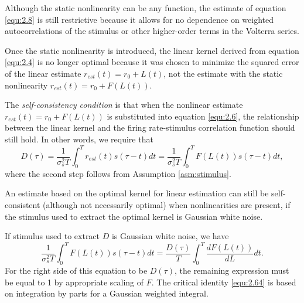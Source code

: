 \begin{rem}
  Although the static nonlinearity can be any function, the estimate of equation \ref{equ:2.8} is still restrictive because it allows for no dependence on weighted autocorrelations of the stimulus or other higher-order terms in the Volterra series.
\end{rem}

\begin{rem}
  Once the static nonlinearity is introduced, the linear kernel derived from equation \ref{equ:2.4} is no longer optimal because it was chosen to minimize the squared error of the linear estimate $r_{est}(t) = r_0 + L(t)$, not the estimate with the static nonlinearity $r_{est}(t) = r_0 + F(L(t))$.
\end{rem}

\begin{defn}
  \label{selfConsistency}
  The \emph{self-consistency condition} is that when the nonlinear estimate $r_{est}(t) = r_0 + F(L(t))$ is substituted into equation \ref{equ:2.6}, the relationship between the linear kernel and the firing rate-stimulus correlation function should still hold. In other words, we require that
  \begin{equation}
    \label{equ:2.63}
    D(\tau)  = \frac{1}{\sigma_s^2T}\int_0^Tr_{est}(t)s(\tau-t)dt = \frac{1}{\sigma_s^2T}\int_0^TF(L(t))s(\tau-t)dt,
  \end{equation}
  where the second step follows from Assumption \ref{asm:stimulus}.
\end{defn}

\begin{thm}
  \label{thm:Bussgang}
  An estimate based on the optimal kernel for linear estimation can still be self-consistent (although not necessarily optimal) when nonlinearities are present, if the stimulus used to extract the optimal kernel is Gaussian white noise.
\end{thm}
\begin{solution}
  If stimulus used to extract $D$ is Gaussian white noise, we have
  \begin{equation}
    \label{equ:2.64}
    \frac{1}{\sigma_s^2T}\int_0^TF(L(t))s(\tau-t)dt = \frac{D(\tau)}{T}\int_0^T\frac{dF(L(t))}{dL}dt.
  \end{equation}
  For the right side of this equation to be $D(\tau)$, the remaining expression must be equal to 1 by appropriate scaling of $F$. The critical identity \ref{equ:2.64} is based on integration by parts for a Gaussian weighted integral.
\end{solution}

